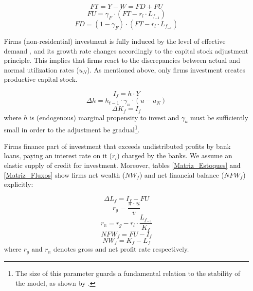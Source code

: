 \documentclass[11pt]{article}
\begin{document}
\begin{equation}
\label{_FT}
    FT = Y - W = FD + FU
\end{equation}
\begin{equation}
    FU = \gamma_F\cdot (FT - r_l\cdot L_{f_{-1}})
\end{equation}
\begin{equation}
    FD = (1-\gamma_F)\cdot (FT - r_l\cdot L_{f_{-1}})
\end{equation}

Firms (non-residential) investment is fully induced by the level of effective demand \cite{freitas_growth_2015}, and its growth rate changes accordingly to the capital stock adjustment principle. 
This implies that firms react to the discrepancies between actual and normal utilization rates (\(u_N\)). 
As mentioned above, only firms investment creates productive capital stock.

\begin{equation}
\label{_If}
    I_f = h\cdot Y
\end{equation}
\begin{equation}
\label{_h}
    \Delta h = h_{t-1}\cdot \gamma_u\cdot (u - u_N)
\end{equation}
\begin{equation}
    \Delta K_f = I_f
\end{equation}
where \(h\) is (endogenous) marginal propensity to invest and \(\gamma_u\) must be sufficiently small in order to the adjustment be gradual\footnote{The size of this parameter guards a fundamental relation to the stability of the model, as shown by \textcite{freitas_growth_2015}.}.

Firms finance part of investment that exceeds undistributed profits by bank loans, paying an interest rate on it (\(r_l\)) charged by the banks. 
We assume an elastic supply of credit for investment. 
Moreover, tables \ref{Matriz_Estoques} and \ref{Matriz_Fluxos} show firms net wealth (\(NW_f\)) and net financial balance (\(NFW_f\)) explicitly:

\begin{equation}
\label{_Lf}
    \Delta L_f = I_f - FU
\end{equation}
$$
r_g = \frac{\pi\cdot u}{v}
$$
$$
r_n = r_g - r_l\cdot\frac{L_{f_{-1}}}{K_f}
$$
\begin{equation}
    NFW_f = FU - I_f
\end{equation}
\begin{equation}
    NW_f = K_f - L_f
\end{equation}
where \(r_g\) and \(r_n\) denotes gross and net profit rate respectively.
\end{document}
